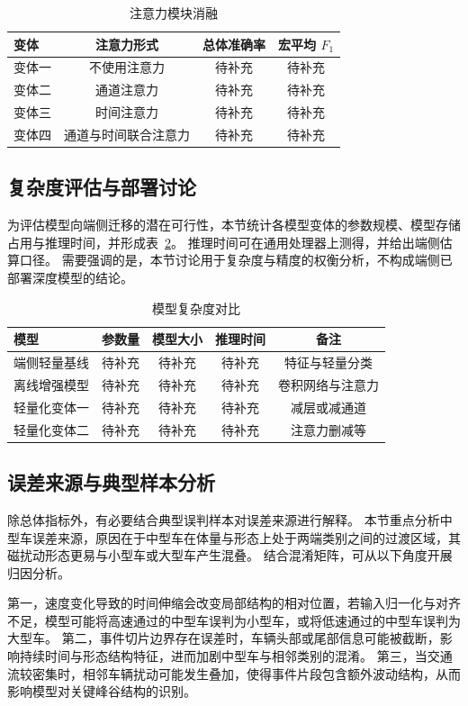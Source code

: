 \documentclass{xdupgthesis}
\begin{document}
\begin{table}[htbp]
\centering
\caption{注意力模块消融}
\label{tab:ch3_ablation_att}
\begin{tabular}{lccc}
\hline
变体 & 注意力形式 & 总体准确率 & 宏平均 $F_1$ \\
\hline
变体一 & 不使用注意力 & 待补充 & 待补充 \\
变体二 & 通道注意力 & 待补充 & 待补充 \\
变体三 & 时间注意力 & 待补充 & 待补充 \\
变体四 & 通道与时间联合注意力 & 待补充 & 待补充 \\
\hline
\end{tabular}
\end{table}

\subsection{复杂度评估与部署讨论}
为评估模型向端侧迁移的潜在可行性，本节统计各模型变体的参数规模、模型存储占用与推理时间，并形成表~\ref{tab:ch3_complexity}。
推理时间可在通用处理器上测得，并给出端侧估算口径。
需要强调的是，本节讨论用于复杂度与精度的权衡分析，不构成端侧已部署深度模型的结论。

\begin{table}[htbp]
\centering
\caption{模型复杂度对比}
\label{tab:ch3_complexity}
\begin{tabular}{lcccc}
\hline
模型 & 参数量 & 模型大小 & 推理时间 & 备注 \\
\hline
端侧轻量基线 & 待补充 & 待补充 & 待补充 & 特征与轻量分类 \\
离线增强模型 & 待补充 & 待补充 & 待补充 & 卷积网络与注意力 \\
轻量化变体一 & 待补充 & 待补充 & 待补充 & 减层或减通道 \\
轻量化变体二 & 待补充 & 待补充 & 待补充 & 注意力删减等 \\
\hline
\end{tabular}
\end{table}

\subsection{误差来源与典型样本分析}
除总体指标外，有必要结合典型误判样本对误差来源进行解释。
本节重点分析中型车误差来源，原因在于中型车在体量与形态上处于两端类别之间的过渡区域，其磁扰动形态更易与小型车或大型车产生混叠。
结合混淆矩阵，可从以下角度开展归因分析。

第一，速度变化导致的时间伸缩会改变局部结构的相对位置，若输入归一化与对齐不足，模型可能将高速通过的中型车误判为小型车，或将低速通过的中型车误判为大型车。
第二，事件切片边界存在误差时，车辆头部或尾部信息可能被截断，影响持续时间与形态结构特征，进而加剧中型车与相邻类别的混淆。
第三，当交通流较密集时，相邻车辆扰动可能发生叠加，使得事件片段包含额外波动结构，从而影响模型对关键峰谷结构的识别。
\end{document}
